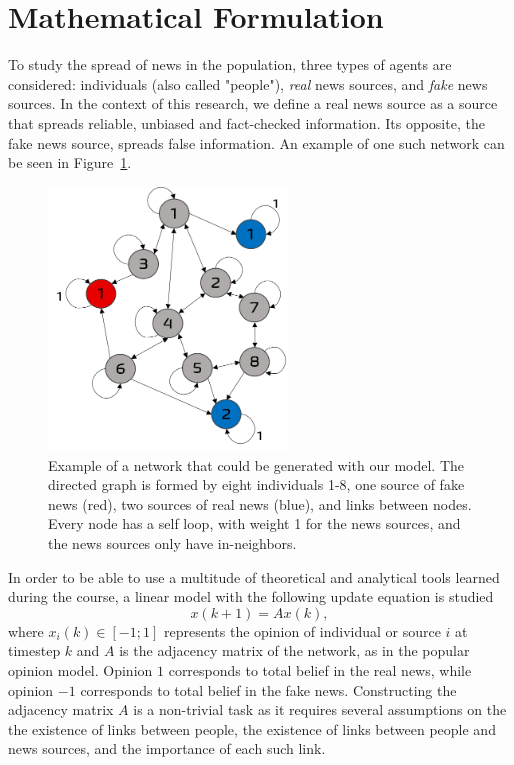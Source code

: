 \section{Mathematical Formulation}
\label{sec:mathematical}
To study the spread of news in the population, three types of agents are considered: individuals (also called "people"), \textit{real} news sources, and \textit{fake} news sources. In the context of this research, we define a real news source as a source that spreads reliable, unbiased and fact-checked information. Its opposite, the fake news source, spreads false information. An example of one such network can be seen in Figure~\ref{pics:network_example}.

\begin{figure}
\centering
\includegraphics[width=2.5in]{Figures/network_example.png}
\caption{Example of a network that could be generated with our model. The directed graph is formed by eight individuals 1-8, one source of fake news (red), two sources of real news (blue), and links between nodes. Every node has a self loop, with weight 1 for the news sources, and the news sources only have in-neighbors.}
\label{pics:network_example}
\end{figure}
In order to be able to use a multitude of theoretical and analytical tools learned during the course, a linear model with the following update equation is studied
\begin{equation}
\label{eq:model}
x(k+1) = A x(k),
\end{equation}
where $x_i(k) \in [-1;1]$ represents the opinion of individual or source  $i$ at timestep $k$ and $A$ is the adjacency matrix of the network, as in the popular opinion model\cite{Friedkin1990}. Opinion $1$ corresponds to total belief in the real news, while opinion $-1$ corresponds to total belief in the fake news.
Constructing the adjacency matrix $A$ is a non-trivial task as it requires several assumptions on the the existence of links between people, the existence of links between people and news sources, and the importance of each such link.
